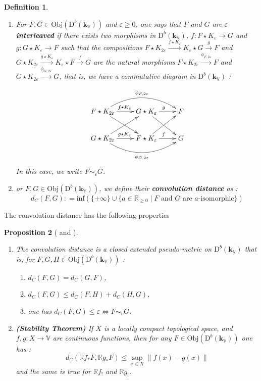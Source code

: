 \documentclass[a4paper, english, 11pt]{article}
\newcommand{\kk}[0]{\textbf{k}}
\newcommand{\0}{\vec{0}}
\newcommand{\R}[0]{\mathbb{R}}
\newcommand{\V}[0]{\mathbb{V}}
\newcommand{\D}[0]{\text{D}}
\newcommand{\Obj}[0]{\text{Obj}}
\newtheorem{prop}{Proposition}[section]
\newtheorem{defi}[prop]{Definition}
\begin{document}
\begin{defi}\label{D:inteleavingconvolution}
\begin{enumerate}\item For $F,G\in \Obj(\D^b(\kk_\V))$ and $\varepsilon\geq 0$, one says that $F$ and $G$
are $\varepsilon$-\textbf{interleaved} if there exists two morphisms in $\D^b(\kk_\V)$, $f : F\star K_\varepsilon \to G$ 
and $g :  G \star K_\varepsilon \to F$ such that the compositions
$F\star K_{2\varepsilon} \stackrel{ f\star K_\varepsilon}{\longrightarrow}K_\varepsilon\star G \stackrel{g}{\longrightarrow} F $ and $G\star K_{2\varepsilon} \stackrel{g \star K_\varepsilon}{\longrightarrow}K_\varepsilon\star F \stackrel{f}{\longrightarrow} G $ are the natural morphisms $F\star K_{2\varepsilon} \stackrel{\phi_{F,2\varepsilon}}{\longrightarrow} F$ and $G\star K_{2\varepsilon} \stackrel{\phi_{G,2\varepsilon}}{\longrightarrow} G$, that is, we have a commutative diagram in $\D^b(\kk_\V)$ :

$$ \xymatrix{
F\star K_{2\varepsilon}  \ar[rd]\ar@/^0.7cm/[rr]^{\phi_{F,2\varepsilon}} \ar[r]^{f\star K_\varepsilon} & G\star K_\varepsilon  \ar[rd] \ar[r]^{g} & F\\
G \star K_{2\varepsilon}  \ar[ur]\ar@/_0.7cm/[rr]_{\phi_{G,2\varepsilon}} \ar[r]^{g\star K_\varepsilon} & F\star K_\varepsilon  \ar[ur] \ar[r]^{f} & G
   } $$ 
In this case, we write $F \sim_\varepsilon G$.
\item or $F,G\in \Obj(\D^b(\kk_\V))$, we define their \textbf{convolution distance} as : $$d_C(F,G) : = \text{inf} \left (\{ +\infty \} \cup \{a \in \R_{\geq 0 } \mid \text{$F$ and $G$ are $a$-isomorphic} \} \right )$$ \end{enumerate}
\end{defi}
The convolution distance has the following properties
\begin{prop}[\cite{KS18} and \cite{Berk18}]\begin{enumerate}
\item The convolution distance is a closed extended pseudo-metric on $\D^b(\kk_\V)$ that is, for $F,G,H \in \Obj(\D^b(\kk_\V))$ : 
\begin{enumerate}
\item $d_C(F,G) = d_C(G,F)$,
\item $d_C(F,G) \leq d_C(F,H) + d_C(H,G)$,
\item  one has $d_C(F,G) \leq \varepsilon 
\iff F \sim_\varepsilon G $.
\end{enumerate}
\item \textbf{(Stability Theorem)} If $X$ is a locally compact topological space, and $f,g : X \to \V$ are continuous functions, then for any $F\in \Obj(\D^b(\kk_\V))$ one has : $$d_C(\R f_* F, \R g_* F) \leq \sup_{x\in X} \|f(x) - g(x) \|$$
and the same is true for $\R f_!$ and $\R g_!$.
\end{enumerate}
\end{prop}
\end{document}
